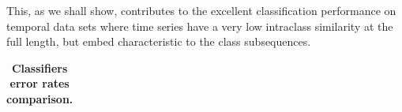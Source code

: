 \documentclass[conference]{IEEEtran}
\newcommand{\myfigureshrinkerless}{\vspace{-0.05cm}}
\begin{document}
This, as we shall show, contributes to the excellent classification performance on temporal 
data sets where time series have a very low intraclass similarity at the full length, but 
embed characteristic to the class subsequences. 

\enlargethispage{0.5cm} 
\begin{footnotesize}
\begin{table}[t]
\myfigureshrinkerless
\caption{\bf Classifiers error rates comparison.}
 \label{perf_table}
\centering
\begin{tabularx}{\linewidth}{@{} l *6X @{}}\toprule[1.5pt]


\end{tabularx}
\end{table}
\end{footnotesize}
\end{document}
